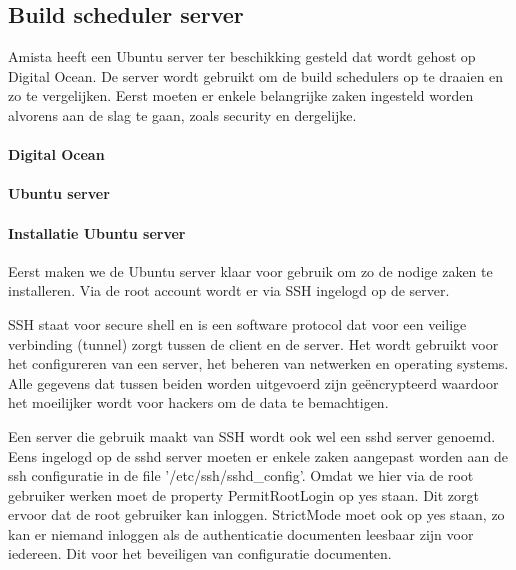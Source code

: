     
        \subsection{Build scheduler server}
        \label{subsec:build-scheduler-server}
        Amista heeft een Ubuntu server ter beschikking gesteld dat wordt gehost op Digital Ocean. De server wordt gebruikt om de build schedulers op te draaien en zo te vergelijken. Eerst moeten er enkele belangrijke zaken ingesteld worden alvorens aan de slag te gaan, zoals security en dergelijke.
    
            \paragraph{Digital Ocean}
            
            \paragraph{Ubuntu server}
            
            \paragraph{Installatie Ubuntu server}
            Eerst maken we de Ubuntu server klaar voor gebruik om zo de nodige zaken te installeren.
            Via de root account wordt er via SSH ingelogd op de server. 
            
            SSH staat voor secure shell en is een software protocol dat voor een veilige verbinding (tunnel) zorgt tussen de client en de server. Het wordt gebruikt voor het configureren van een server, het beheren van netwerken en operating systems. Alle gegevens dat tussen beiden worden uitgevoerd zijn geëncrypteerd waardoor het moeilijker wordt voor hackers om de data te bemachtigen.
            
            Een server die gebruik maakt van SSH wordt ook wel een sshd server genoemd. Eens ingelogd op de sshd server moeten er enkele zaken aangepast worden aan de ssh configuratie in de file '/etc/ssh/sshd\_config'. Omdat we hier via de root gebruiker werken moet de property PermitRootLogin op yes staan. Dit zorgt ervoor dat de root gebruiker kan inloggen.
            StrictMode moet ook op yes staan, zo kan er niemand inloggen als de authenticatie documenten leesbaar zijn voor iedereen. Dit voor het beveiligen van configuratie documenten. %
            
